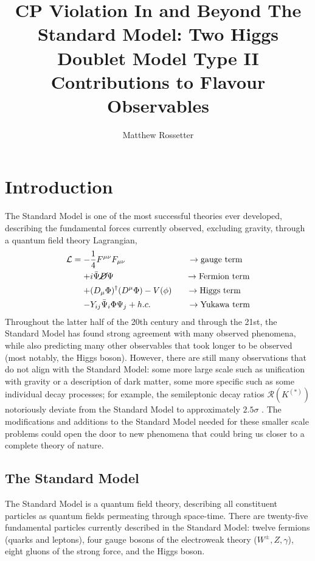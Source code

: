 \documentclass[a4paper,12pt]{article}
\title{CP Violation In and Beyond The Standard Model: Two Higgs Doublet Model Type II Contributions to Flavour Observables}
\author{Matthew Rossetter}
\affiliation{Supervised By Alexander Lenz}
\affiliation{MPhys Theoretical Physics, Durham University}
\begin{document}
 
\maketitle

\vspace{-20pt}
\section{Introduction}
\vspace{-5pt}
The Standard Model \cite{gsw} is one of the most successful theories ever developed, describing the fundamental forces currently observed, excluding gravity, through a quantum field theory Lagrangian,
\vspace{-15pt}
\begin{equation}
    \label{eq:sm}
    \begin{split}
        \mathcal{L} = -&\frac14 F^{\mu\nu}F_{\mu\nu} \qquad\qquad\qquad\quad\;\to \text{gauge term}\\
                      +& i\bar{\Psi}\cancel{D}\Psi \qquad\qquad\qquad\qquad\;\,\to \text{Fermion term} \\
                      +& (D_\mu\Phi)^\dagger(D^\mu\Phi) - V(\phi) \quad\;\;\,\to \text{Higgs term}\\
                      -& Y_{ij}\bar{\Psi}_i\Phi\Psi_j + h.c. \qquad\qquad\;\to\text{Yukawa term}
    \end{split}
\end{equation}
Throughout the latter half of the 20th century and through the 21st, the Standard Model has found strong agreement with many observed phenomena, while also predicting many other observables that took longer to be observed (most notably, the Higgs boson).
However, there are still many observations that do not align with the Standard Model: some more large scale such as unification with gravity or a description of dark matter, some more specific such as some individual decay processes; for example, the semileptonic decay ratios $\mathcal{R}(K^{(*)})$ notoriously deviate from the Standard Model to approximately $2.5\sigma$ \cite{pdg}.
The modifications and additions to the Standard Model needed for these smaller scale problems could open the door to new phenomena that could bring us closer to a complete theory of nature. 

\subsection{The Standard Model}
The Standard Model is a quantum field theory, describing all constituent particles as quantum fields permeating through space-time. 
There are twenty-five fundamental particles currently described in the Standard Model: twelve fermions (quarks and leptons), four gauge bosons of the electroweak theory ($W^\pm,Z,\gamma$), eight gluons of the strong force, and the Higgs boson.
\end{document}
